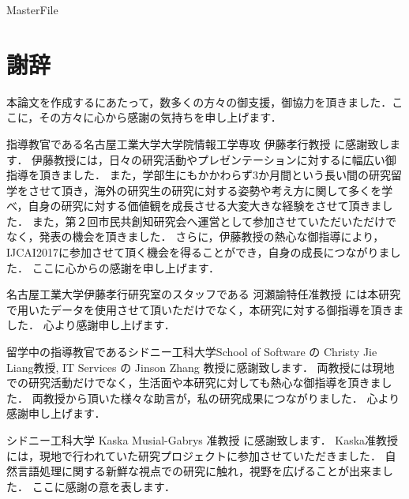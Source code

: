 \expandafter\ifx\csname MasterFile\endcsname\relax
\def\SubFile{hoge}


\fi
\cleardoublepage
\chapter*{謝辞}

本論文を作成するにあたって，数多くの方々の御支援，御協力を頂きました．ここに，その方々に心から感謝の気持ちを申し上げます． \par
\vspace{0.5cm}

指導教官である名古屋工業大学大学院情報工学専攻 伊藤孝行教授 に感謝致します．
伊藤教授には，日々の研究活動やプレゼンテーションに対するに幅広い御指導を頂きました．
また，学部生にもかかわらず3か月間という長い間の研究留学をさせて頂き，海外の研究生の研究に対する姿勢や考え方に関して多くを学べ，自身の研究に対する価値観を成長させる大変大きな経験をさせて頂きました．
また，第２回市民共創知研究会へ運営として参加させていただいただけでなく，発表の機会を頂きました．
さらに，伊藤教授の熱心な御指導により，IJCAI2017に参加させて頂く機会を得ることができ，自身の成長につながりました．
ここに心からの感謝を申し上げます． \par
\vspace{0.5cm}

名古屋工業大学伊藤孝行研究室のスタッフである 河瀬諭特任准教授 には本研究で用いたデータを使用させて頂いただけでなく，本研究に対する御指導を頂きました．
心より感謝申し上げます． \par
\vspace{0.5cm}

留学中の指導教官であるシドニー工科大学School of Software の  Christy Jie Liang教授, IT Services の  Jinson Zhang 教授に感謝致します．
両教授には現地での研究活動だけでなく，生活面や本研究に対しても熱心な御指導を頂きました．
両教授から頂いた様々な助言が，私の研究成果につながりました．
心より感謝申し上げます． \par
\vspace{0.5cm}

シドニー工科大学 Kaska Musial-Gabrys 准教授 に感謝致します．
Kaska准教授には，現地で行われていた研究プロジェクトに参加させていただきました．
自然言語処理に関する新鮮な視点での研究に触れ，視野を広げることが出来ました．
ここに感謝の意を表します． \par
\vspace{0.5cm}

